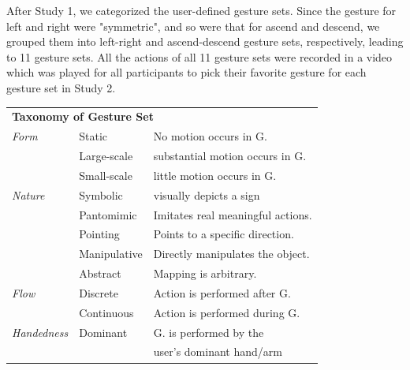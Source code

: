 \documentclass{sigchi}
\newcommand\tabhead[1]{\small\textbf{#1}}
\begin{document}
After Study 1, we categorized the user-defined gesture sets. Since the gesture for left and right were "symmetric", and so were that for ascend and descend, we grouped them into left-right and ascend-descend gesture sets, respectively, leading to 11 gesture sets. All the actions of all 11 gesture sets were recorded in a video which was played for all participants to pick their favorite gesture for each gesture set in Study 2.

\begin{table}
  \centering
  \begin{adjustwidth}{-0.4cm}{}
  \begin{tabular}{|l|l|l|}
    \hline
    \multicolumn{3}{|p{1.06\columnwidth}|}{\centering\tabhead{\textbf{Taxonomy of Gesture Set}}}\\
    \Xhline{4\arrayrulewidth}
    \em{Form} &Static& No motion occurs in G.\\ \cline{2-3}
    &Large-scale& substantial motion occurs in G. \\ \cline{2-3}
    &Small-scale& little motion occurs in G.\\
    \Xhline{4\arrayrulewidth}
    \em{Nature} & Symbolic &visually depicts a sign \\ \cline{2-3}
    &Pantomimic&Imitates real meaningful actions.\\ \cline{2-3}
    &Pointing&Points to a specific direction.\\ \cline{2-3}
    &Manipulative&Directly manipulates the object.\\ \cline{2-3}
    &Abstract&Mapping is arbitrary.\\
    \Xhline{4\arrayrulewidth}
    \em{Flow} & Discrete&Action is performed after G.\\ \cline{2-3}
    &Continuous&Action is performed during G.\\ 
    \Xhline{4\arrayrulewidth}
    \em{Handedness} & Dominant & G. is performed by the \\&&user's dominant hand/arm \\ \cline{2-3}

\end{tabular}
\end{adjustwidth}
\end{table}
\end{document}
